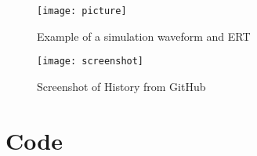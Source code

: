 \documentclass[11pt]{article}
\newcommand{\Verilog}[2][]{%
	
}
\begin{document}
\begin{figure}[th]
	\centering
	\texttt{[image: picture]}
	\caption{Example of a simulation waveform and ERT}
	\label{fig:picture}
\end{figure}

\begin{figure}[th]
	\centering
	\texttt{[image: screenshot]}
	\caption{Screenshot of History from GitHub}
	\label{fig:screenshot}
\end{figure}

\newpage
\section*{Code}

\Verilog[caption=File-included Verilog code example,label=code:file_ex]{lab1_example_code.sv}
\end{document}
